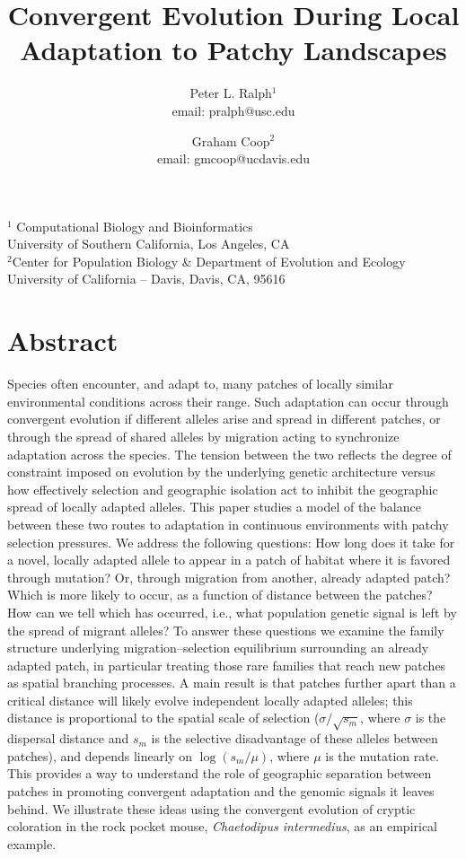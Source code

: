 \documentclass{article}
\date{}
\title 
{
Convergent Evolution During Local Adaptation to Patchy Landscapes
}
\author{Peter L. Ralph$^1$ \\ email: pralph@usc.edu  \and Graham Coop$^2$ \\ email: gmcoop@ucdavis.edu }
\begin{document}
\maketitle
\begin{center}

$^1$ Computational Biology and Bioinformatics \\ 
University of Southern California, Los Angeles, CA \\
$^2$Center for Population Biology \& Department of Evolution and Ecology \\ 
University of California -- Davis, Davis, CA, 95616
\end{center}


\section*{Abstract}
Species often encounter, and adapt to, many patches of locally similar environmental conditions across their range. 
Such adaptation can occur through convergent evolution if different alleles arise and spread in different patches, 
or through the spread of shared alleles by migration
acting to synchronize adaptation across the species.
The tension between the two reflects 
the degree of constraint imposed on evolution by the underlying genetic architecture 
versus how effectively selection and geographic isolation act to inhibit the geographic spread of locally adapted alleles.
This paper studies a model of the balance between these two routes to adaptation in continuous environments with patchy selection pressures.
We address the following questions: 
How long does it take for a novel, locally adapted allele to appear in a
patch of habitat where it is favored through mutation?
Or, through migration from another, already adapted patch?
Which is more likely to occur, as a function of distance between the patches?
How can we tell which has occurred, i.e., what population genetic
signal is left by the spread of migrant alleles?
To answer these questions we examine the family structure underlying migration--selection equilibrium
surrounding an already adapted patch,
in particular treating those rare families that reach new patches
as spatial branching processes.
A main result is that patches further apart than a critical distance will
likely evolve independent locally adapted alleles;
this distance is proportional to the spatial scale of selection
($\sigma/\sqrt{s_m}$, where $\sigma$ is the dispersal distance and
$s_m$ is the selective disadvantage of these alleles between patches),
and depends linearly on $\log(s_m/\mu)$, where $\mu$ is the mutation rate.
This provides a way to understand the role of geographic separation between patches 
in promoting convergent adaptation and the genomic signals it leaves behind.
We illustrate these ideas using the convergent evolution of cryptic coloration in the rock pocket mouse, \textit{Chaetodipus intermedius}, as an empirical example.
\end{document}
